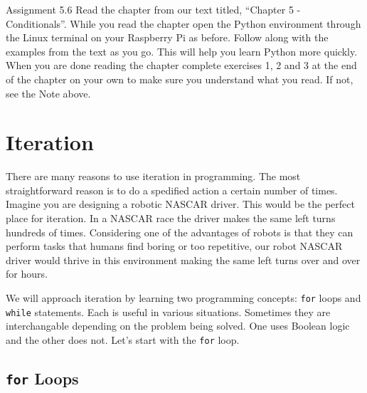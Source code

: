 \documentclass[
]{book}
\begin{document}
Assignment 5.6
Read the chapter from our text titled, ``Chapter 5 - Conditionals''. While you read the chapter open the Python environment through the Linux terminal on your Raspberry Pi as before. Follow along with the examples from the text as you go. This will help you learn Python more quickly. When you are done reading the chapter complete exercises 1, 2 and 3 at the end of the chapter on your own to make sure you understand what you read. If not, see the Note above.

\hypertarget{iteration}{%
\section{Iteration}\label{iteration}}

There are many reasons to use iteration in programming. The most straightforward reason is to do a spedified action a certain number of times. Imagine you are designing a robotic NASCAR driver. This would be the perfect place for iteration. In a NASCAR race the driver makes the same left turns hundreds of times. Considering one of the advantages of robots is that they can perform tasks that humans find boring or too repetitive, our robot NASCAR driver would thrive in this environment making the same left turns over and over for hours.

We will approach iteration by learning two programming concepts: \texttt{for} loops and \texttt{while} statements. Each is useful in various situations. Sometimes they are interchangable depending on the problem being solved. One uses Boolean logic and the other does not. Let's start with the \texttt{for} loop.

\hypertarget{for-loops}{%
\subsection{\texorpdfstring{\texttt{for} Loops}{for Loops}}\label{for-loops}}
\end{document}
